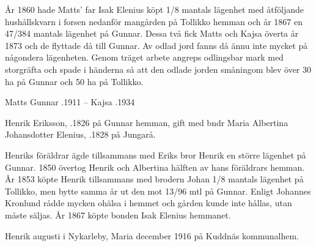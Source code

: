 År 1860 hade Matts' far Isak Elenius köpt 1/8 mantals lägenhet med åtföljande hushållskvarn i forsen nedanför mangården på Tollikko hemman och år 1867 en 47/384 mantals lägenhet på Gunnar. Dessa två fick Matts och Kajsa överta år 1873 och de flyttade då till Gunnar. Av odlad jord fanns då ännu inte mycket på någondera lägenheten. Genom träget arbete angreps odlingsbar mark med storgräfta och spade i händerna så att den odlade jorden småningom blev över 30 ha på Gunnar och 50 ha på Tollikko.

Matts Gunnar .1911  --  Kajsa .1934


Henrik Eriksson, .1826 på Gunnar hemman, gift med bndr Maria Albertina Johansdotter Elenius, .1828 på Jungarå.

\begin{jhchildren}
  \item {}
  \item {}
  \item {}
  \item {}
  \item {}
  \item {}
  \item {}
  \item {}
  \item {}
  \item {}
\end{jhchildren}

Henriks föräldrar ägde tillsammans med Eriks bror Henrik en större lägenhet på Gunnar. 1850 övertog Henrik och Albertina hälften av hans föräldrars hemman. År 1853 köpte Henrik tillsammans med brodern Johan 1/8 mantals lägenhet på Tollikko, men bytte samma år ut den mot 13/96 mtl på Gunnar. Enligt Johannes Kronlund rådde mycken ohälsa i hemmet och gården kunde inte hållas, utan måste säljas. År 1867 köpte bonden Isak Elenius hemmanet.

Henrik  augusti i Nykarleby, Maria  december 1916 på Kuddnäs kommunalhem.






